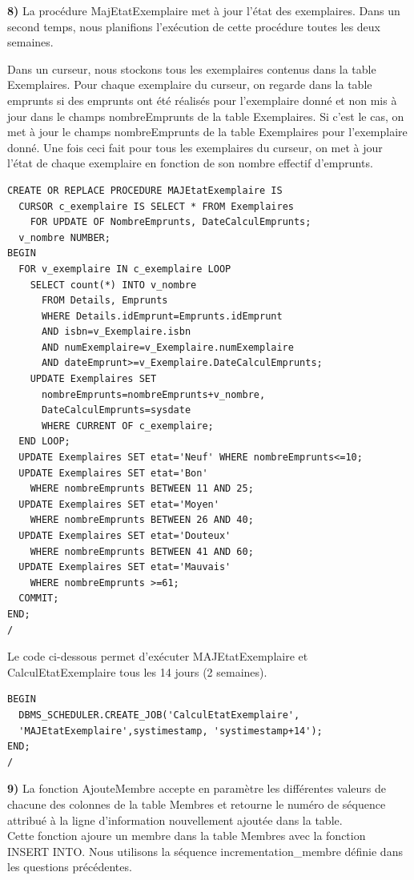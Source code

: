 \documentclass[a4paper,12pt]{article}
\begin{document}
\textbf {8)} La procédure MajEtatExemplaire met à jour l’état des exemplaires. Dans un second temps, nous planifions l’exécution de cette procédure toutes les deux semaines.

Dans un curseur, nous stockons tous les exemplaires contenus dans la table Exemplaires. Pour chaque exemplaire du curseur, on regarde dans la table emprunts si des emprunts ont été réalisés pour l'exemplaire donné et non mis à jour dans le champs nombreEmprunts de la table Exemplaires. Si c'est le cas, on met à jour le champs nombreEmprunts de la table Exemplaires pour l'exemplaire donné. Une fois ceci fait pour tous les exemplaires du curseur, on met à jour l'état de chaque exemplaire en fonction de son nombre effectif d'emprunts.

\begin{lstlisting}
CREATE OR REPLACE PROCEDURE MAJEtatExemplaire IS
  CURSOR c_exemplaire IS SELECT * FROM Exemplaires 
    FOR UPDATE OF NombreEmprunts, DateCalculEmprunts;
  v_nombre NUMBER;
BEGIN
  FOR v_exemplaire IN c_exemplaire LOOP
    SELECT count(*) INTO v_nombre
      FROM Details, Emprunts
      WHERE Details.idEmprunt=Emprunts.idEmprunt
      AND isbn=v_Exemplaire.isbn 
      AND numExemplaire=v_Exemplaire.numExemplaire
      AND dateEmprunt>=v_Exemplaire.DateCalculEmprunts;
    UPDATE Exemplaires SET 
      nombreEmprunts=nombreEmprunts+v_nombre,
      DateCalculEmprunts=sysdate 
      WHERE CURRENT OF c_exemplaire;
  END LOOP;
  UPDATE Exemplaires SET etat='Neuf' WHERE nombreEmprunts<=10;
  UPDATE Exemplaires SET etat='Bon' 
    WHERE nombreEmprunts BETWEEN 11 AND 25;
  UPDATE Exemplaires SET etat='Moyen' 
    WHERE nombreEmprunts BETWEEN 26 AND 40;
  UPDATE Exemplaires SET etat='Douteux' 
    WHERE nombreEmprunts BETWEEN 41 AND 60;
  UPDATE Exemplaires SET etat='Mauvais' 
    WHERE nombreEmprunts >=61;
  COMMIT;
END;
/
\end{lstlisting}

Le code ci-dessous permet d’exécuter MAJEtatExemplaire et CalculEtatExemplaire tous les 14 jours (2 semaines).

\begin{lstlisting}
BEGIN
  DBMS_SCHEDULER.CREATE_JOB('CalculEtatExemplaire',
  'MAJEtatExemplaire',systimestamp, 'systimestamp+14');
END;
/
\end{lstlisting}

\textbf {9)} La fonction AjouteMembre accepte en paramètre les différentes valeurs de chacune des colonnes de la table Membres et retourne le numéro de séquence attribué à la ligne d’information nouvellement ajoutée dans la table. \\
Cette fonction ajoure un membre dans la table Membres avec la fonction INSERT INTO. Nous utilisons la séquence incrementation\_membre définie dans les questions précédentes.
\end{document}
